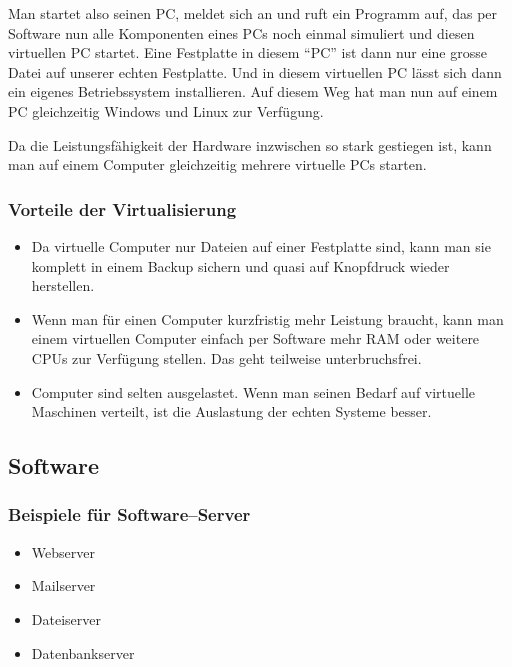 {            Man startet also seinen PC, meldet sich an und ruft ein Programm auf, das per Software nun alle Komponenten eines PCs noch einmal simuliert und diesen virtuellen PC startet. Eine Festplatte in diesem ``PC'' ist dann nur eine grosse Datei auf unserer echten Festplatte. Und in diesem virtuellen PC lässt sich dann ein eigenes Betriebssystem installieren. Auf diesem Weg hat man nun auf einem PC gleichzeitig Windows und Linux zur Verfügung.
      
            Da die Leistungsfähigkeit der Hardware inzwischen so stark gestiegen ist, kann man auf einem Computer gleichzeitig mehrere virtuelle PCs starten.}
      
      \begin{frame}
      \frametitle{Vorteile der Virtualisierung}
        \begin{itemize}
          \item Da virtuelle Computer nur Dateien auf einer Festplatte sind, kann man sie komplett in einem Backup sichern und quasi auf Knopfdruck wieder herstellen.
          \item Wenn man für einen Computer kurzfristig mehr Leistung braucht, kann man einem virtuellen Computer einfach per Software mehr RAM oder weitere CPUs zur Verfügung stellen. Das geht teilweise unterbruchsfrei.
          \item Computer sind selten ausgelastet. Wenn man seinen Bedarf auf virtuelle Maschinen verteilt, ist die Auslastung der echten Systeme besser.
        \end{itemize}
      \end{frame}

    \subsection{Software}


      \begin{frame}
      \frametitle{Beispiele für Software--Server}
        \begin{itemize}
          \item Webserver
          \item Mailserver
          \item Dateiserver
          \item Datenbankserver
        \end{itemize}
      \end{frame}

  
  